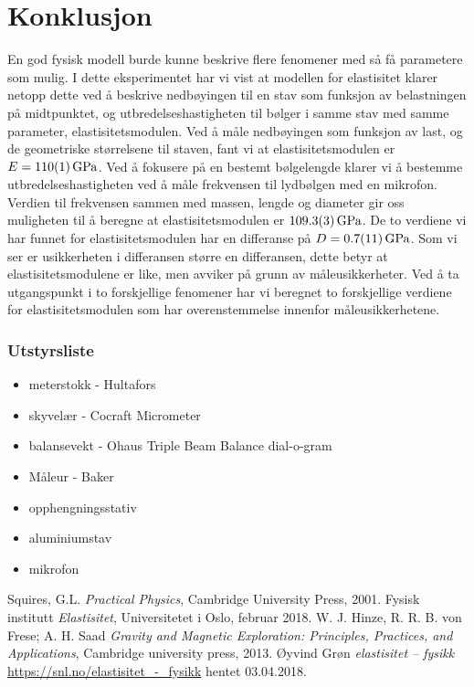 \documentclass[%
 reprint,
 amsmath,amssymb,
 aps,
 norsk,
 booktabs
]{revtex4-1}
\begin{document}
\section{Konklusjon}
En god fysisk modell burde kunne beskrive flere fenomener med så få parametere som mulig. I dette eksperimentet har vi vist at modellen for elastisitet klarer netopp dette ved å beskrive nedbøyingen til en stav som funksjon av belastningen på midtpunktet, og utbredelseshastigheten til bølger i samme stav med samme parameter, elastisitetsmodulen.
Ved å måle nedbøyingen som funksjon av last, og de geometriske størrelsene til staven, fant vi at elastisitetsmodulen er $E=\SI{110\pm1}{\giga\pascal}$.
Ved å fokusere på en bestemt bølgelengde klarer vi å bestemme utbredelseshastigheten ved å måle frekvensen til lydbølgen med en mikrofon. Verdien til frekvensen sammen med massen, lengde og diameter gir oss muligheten til å beregne at elastisitetsmodulen er $\SI{109.3\pm0.3}{\giga\pascal}$.
De to verdiene vi har funnet for elastisitetsmodulen har en differanse på $D = \SI{0.7\pm1.1}{\giga\pascal}$. Som vi ser er usikkerheten i differansen større en differansen, dette betyr at elastisitetsmodulene er like, men avviker på grunn av måleusikkerheter. Ved å ta utgangspunkt i to forskjellige fenomener har vi beregnet to forskjellige verdiene for elastisitetsmodulen som har overenstemmelse innenfor måleusikkerhetene.
\subsubsection*{Utstyrsliste}
\begin{itemize}
\label{utstyr}
\item meterstokk - Hultafors
\item skyvelær - Cocraft Micrometer
\item balansevekt - Ohaus Triple Beam Balance dial-o-gram
\item Måleur - Baker
\item opphengningsstativ
\item aluminiumstav
\item mikrofon
\end{itemize}
\begin{thebibliography}{9}
Squires, G.L. \emph{Practical Physics}, Cambridge University Press, 2001.
Fysisk institutt \emph{Elastisitet}, Universitetet i Oslo, februar 2018.
W. J. Hinze, R. R. B. von Frese; A. H. Saad \emph{Gravity and Magnetic Exploration: Principles, Practices, and Applications}, Cambridge university press, 2013.
Øyvind Grøn \emph{elastisitet – fysikk} \url{https://snl.no/elastisitet_-_fysikk} hentet 03.04.2018.
\end{thebibliography}
\end{document}

